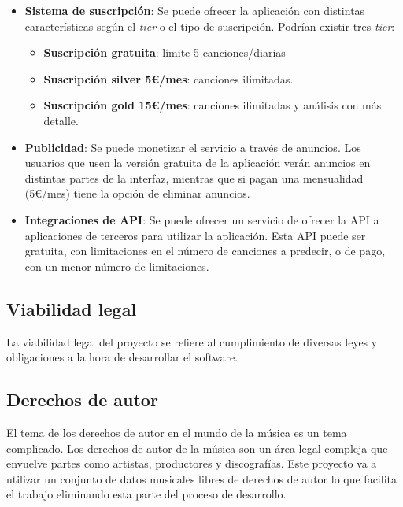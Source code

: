 \begin{itemize}
\tightlist

\item \textbf{Sistema de suscripción}: Se puede ofrecer la aplicación con distintas características según el \textit{tier} o el tipo de suscripción. Podrían existir tres \textit{tier}:
	\begin{itemize}
	\tightlist
	\item \textbf{Suscripción gratuita}: límite 5 canciones/diarias

	\item \textbf{Suscripción silver 5€/mes}: canciones ilimitadas.

	\item \textbf{Suscripción gold 15€/mes}: canciones ilimitadas y análisis con más detalle.
	\end{itemize}

\item \textbf{Publicidad}: Se puede monetizar el servicio a través de anuncios. Los usuarios que usen la versión gratuita de la aplicación verán anuncios en distintas partes de la interfaz, mientras que si pagan una mensualidad (5€/mes) tiene la opción de eliminar anuncios.

\item \textbf{Integraciones de API}: Se puede ofrecer un servicio de ofrecer la API a aplicaciones de terceros para utilizar la aplicación. Esta API puede ser gratuita, con limitaciones en el número de canciones a predecir, o de pago, con un menor número de limitaciones.
\end{itemize}

\subsection{Viabilidad legal}

La viabilidad legal del proyecto se refiere al cumplimiento de diversas leyes y obligaciones a la hora de desarrollar el software.

\subsection{Derechos de autor}

El tema de los derechos de autor en el mundo de la música es un tema complicado. Los derechos de autor de la música son un área legal compleja que envuelve partes como artistas, productores y discografías. Este proyecto va a utilizar un conjunto de datos musicales libres de derechos de autor lo que facilita el trabajo eliminando esta parte del proceso de desarrollo.

